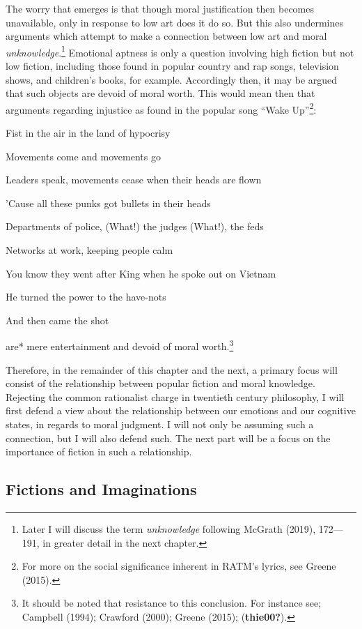 \documentclass[12pt]{book}
\theoremstyle{definition}
\theoremstyle{remark}
\begin{document}
The worry that emerges is that though moral justification then becomes unavailable, only in response to low art does it do so. But this also undermines arguments which attempt to make a connection between low art and moral \emph{unknowledge}.\footnote{Later I will discuss the term \emph{unknowledge} following McGrath (2019), 172---191, in greater detail in the next chapter.} Emotional aptness is only a question involving high fiction but not low fiction, including those found in popular country and rap songs, television shows, and children's books, for example. Accordingly then, it may be argued that such objects are devoid of moral worth. This would mean then that arguments regarding injustice as found in the popular song ``Wake Up''\footnote{For more on the social significance inherent in RATM's lyrics, see Greene (2015).}:

Fist in the air in the land of hypocrisy

Movements come and movements go

Leaders speak, movements cease when their heads are flown

'Cause all these punks got bullets in their heads

Departments of police, (What!) the judges (What!), the feds

Networks at work, keeping people calm

You know they went after King when he spoke out on Vietnam

He turned the power to the have-nots

And then came the shot

\noindent *are* mere entertainment and devoid of moral worth.\footnote{It should be noted that resistance to this conclusion. For instance see; Campbell (1994); Crawford (2000); Greene (2015); (\textbf{thie00?}).}

Therefore, in the remainder of this chapter and the next, a primary focus will consist of the relationship between popular fiction and moral knowledge. Rejecting the common rationalist charge in twentieth century philosophy, I will first defend a view about the relationship between our emotions and our cognitive states, in regards to moral judgment. I will not only be assuming such a connection, but I will also defend such. The next part will be a focus on the importance of fiction in such a relationship.

\subsection*{Fictions and Imaginations}\label{fictions-and-imaginations}
\end{document}
